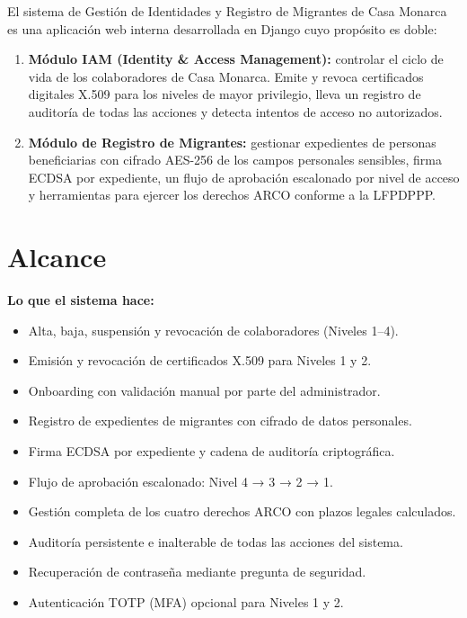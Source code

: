 \documentclass[10pt,letterpaper]{report}
\begin{document}
El sistema de Gestión de Identidades y Registro de Migrantes de Casa Monarca es una aplicación web interna desarrollada en Django cuyo propósito es doble:

\begin{enumerate}[leftmargin=*]
    \item \textbf{Módulo IAM (Identity \& Access Management):} controlar el ciclo de vida de los colaboradores de Casa Monarca. Emite y revoca certificados digitales X.509 para los niveles de mayor privilegio, lleva un registro de auditoría de todas las acciones y detecta intentos de acceso no autorizados.

    \item \textbf{Módulo de Registro de Migrantes:} gestionar expedientes de personas beneficiarias con cifrado AES-256 de los campos personales sensibles, firma ECDSA por expediente, un flujo de aprobación escalonado por nivel de acceso y herramientas para ejercer los derechos ARCO conforme a la LFPDPPP.
\end{enumerate}

\section{Alcance}

\textbf{Lo que el sistema hace:}
\begin{itemize}[leftmargin=*]
    \item Alta, baja, suspensión y revocación de colaboradores (Niveles 1--4).
    \item Emisión y revocación de certificados X.509 para Niveles 1 y 2.
    \item Onboarding con validación manual por parte del administrador.
    \item Registro de expedientes de migrantes con cifrado de datos personales.
    \item Firma ECDSA por expediente y cadena de auditoría criptográfica.
    \item Flujo de aprobación escalonado: Nivel 4 → 3 → 2 → 1.
    \item Gestión completa de los cuatro derechos ARCO con plazos legales calculados.
    \item Auditoría persistente e inalterable de todas las acciones del sistema.
    \item Recuperación de contraseña mediante pregunta de seguridad.
    \item Autenticación TOTP (MFA) opcional para Niveles 1 y 2.
\end{itemize}
\end{document}
